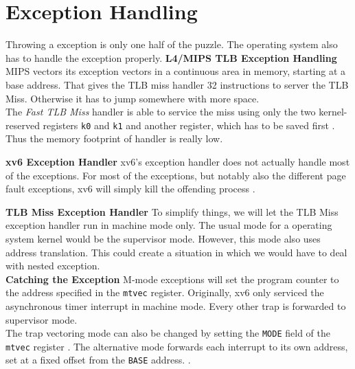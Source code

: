 
\section{Exception Handling}
Throwing a exception is only one half of the puzzle. The operating system also has to handle the exception
properly.
\textbf{L4/MIPS TLB Exception Handling}
MIPS vectors its exception vectors in a continuous area in memory, starting at a base address.
That gives the TLB miss handler 32 instructions to server the TLB Miss. Otherwise it has to jump
somewhere with more space.\\
The \emph{Fast TLB Miss} handler is able to service the miss using only the two kernel-reserved
registers \texttt{k0} and \texttt{k1} and another register, which has to be saved first \cite{heiserAnatomyHighPerformanceMicrokernel}.\\
Thus the memory footprint of handler is really low.

\textbf{xv6 Exception Handler}
xv6's exception handler does not actually handle most of the exceptions. For most of the exceptions,
but notably also the different page fault exceptions, xv6 will simply kill the offending process \cite{cox2011xv6}.

\textbf{TLB Miss Exception Handler}
To simplify things, we will let the TLB Miss exception handler run in machine mode only.
The usual mode for a operating system kernel would be the supervisor mode. However, this
mode also uses address translation. This could create a situation in which we would have
to deal with nested exception.\\

\textbf{Catching the Exception} M-mode exceptions will set the program counter to the address
specified in the \texttt{mtvec} register. Originally, xv6 only serviced the asynchronous
timer interrupt in machine mode. Every other trap is forwarded to supervisor mode.\\
The trap vectoring mode can also be changed by setting the \texttt{MODE} field of the
\texttt{mtvec} register \cite{RISCVInstructionSet}. The alternative mode forwards
each interrupt to its own address, set at a fixed offset from the \texttt{BASE} address.
.

